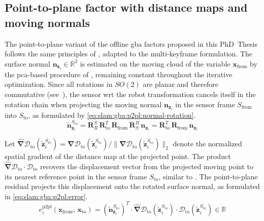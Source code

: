 \subsection{Point-to-plane factor with distance maps and moving normals}
\label{sec:slam:gba:p2pl}

The point-to-plane variant of the offline \gls{gba} factors proposed in this
PhD~Thesis follows the same principles of
, adapted to the multi-keyframe
formulation. The surface normal $\mathbf{n}_{\mathbf{z}_i}\in\mathbb{R}^2$ is
estimated on the moving cloud of the variable $\mathbf{x}_{\mathrm{from}}$ by
the \gls{pca}-based procedure of
, remaining constant
throughout the iterative optimization. Since all rotations in $SO(2)$ are planar
and therefore commutative (see~),
the sensor \gls{wrt} the robot transformation cancels itself in the rotation
chain when projecting the moving normal $\mathbf{n}_{\mathbf{z}_i}$ in
the sensor frame $S_{\mathrm{from}}$ into $S_{\mathrm{to}}$, as formulated by
\eqref{eq:slam:gba:p2pl:normal-rotation}.
\begin{equation}
\label{eq:slam:gba:p2pl:normal-rotation}
\tilde{\mathbf{n}}_{\mathbf{z}_i}^{S_{\mathrm{to}}} =
\mathbf{R}_R^S\,\mathbf{R}_{\mathrm{to}}^T\,\mathbf{R}_{\mathrm{from}}\,
\mathbf{R}_S^R\,\mathbf{n}_{\mathbf{z}_i} =
\mathbf{R}_{\mathrm{to}}^T\,\mathbf{R}_{\mathrm{from}}\,\mathbf{n}_{\mathbf{z}_i}
\end{equation}

Let
$\hat{\bm{\nabla}}\mathcal{D}_{\mathrm{to}}\!\left(\tilde{\mathbf{z}}_i^{S_{\mathrm{to}}}\right)
= \bm{\nabla}\mathcal{D}_{\mathrm{to}}\!\left(\tilde{\mathbf{z}}_i^{S_{\mathrm{to}}}\right)
/ \|\bm{\nabla}\mathcal{D}_{\mathrm{to}}\!\left(\tilde{\mathbf{z}}_i^{S_{\mathrm{to}}}\right)\|_2$
denote the normalized spatial gradient of the distance map at the projected
point. The product
$\hat{\bm{\nabla}}\mathcal{D}_{\mathrm{to}}\cdot
\mathcal{D}_{\mathrm{to}}$ recovers the displacement vector from the
projected moving point to its nearest reference point in the
sensor frame $S_{\mathrm{to}}$, similar to
. The point-to-plane
residual projects this displacement onto the rotated surface normal, as
formulated in \eqref{eq:slam:gba:p2pl:error}.
\begin{equation}
\label{eq:slam:gba:p2pl:error}
e_i^{\mathrm{p2pl}}\!\left(\mathbf{x}_{\mathrm{from}},\,
                           \mathbf{x}_{\mathrm{to}}\right) =
\left(\tilde{\mathbf{n}}_{\mathbf{z}_i}^{S_{\mathrm{to}}}\right)^T\cdot
\hat{\bm{\nabla}}\mathcal{D}_{\mathrm{to}}\!\left(\tilde{\mathbf{z}}_i^{S_{\mathrm{to}}}\right)\cdot
\mathcal{D}_{\mathrm{to}}\!\left(\tilde{\mathbf{z}}_i^{S_{\mathrm{to}}}\right)
\in \mathbb{R}
\end{equation}

